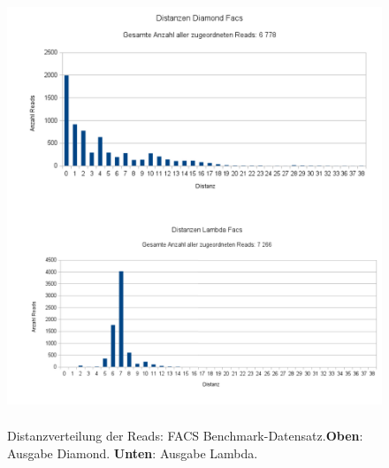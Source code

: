 \documentclass[10pt, a4paper]{report}[08.12.2015]
\begin{document}
    \begin{figure}[H]
      \centering
      \noindent\includegraphics[width=\linewidth,height=13cm,
      keepaspectratio]{Abbildungen/Facs_Distanzen_both.png}
      \caption[Distanzverteilung der Reads: FACS Benchmark-Datensatz.]{\small{Distanzverteilung der Reads: FACS Benchmark-Datensatz.\newline \textbf{Oben}: Ausgabe Diamond. \textbf{Unten}: Ausgabe Lambda.}}
      \label{fig:facs}
    \end{figure}
    
\end{document}
